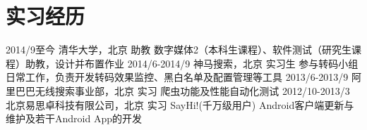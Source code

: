 \documentclass[]{friggeri-cv-cn}
\begin{document}


\section{实习经历}

\begin{entrylist}
  \entry
    {2014/9至今}
    {清华大学，北京}
    {助教}
    {数字媒体2（本科生课程）、软件测试（研究生课程）助教，设计并布置作业}
  \entry
    {2014/6-2014/9}
    {神马搜索，北京}
    {实习生}
    {参与转码小组日常工作，负责开发转码效果监控、黑白名单及配置管理等工具}
  \entry
    {2013/6-2013/9}
    {阿里巴巴无线搜索事业部，北京}
    {实习}
    {爬虫功能及性能自动化测试}
  \entry
    {2012/10-2013/3}
    {北京易思卓科技有限公司，北京}
    {实习}
    {SayHi!(千万级用户) Android客户端更新与维护及若干Android App的开发}
\end{entrylist}
\end{document}
